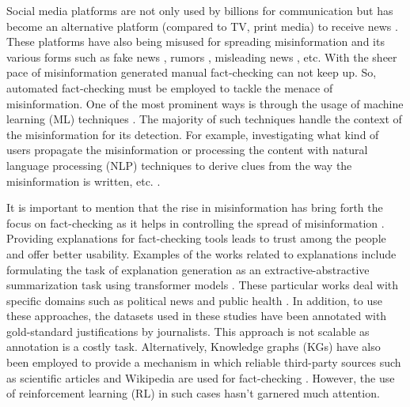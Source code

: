 Social media platforms are not only used by billions for communication but has become an alternative platform (compared to TV, print media) to receive news \cite{Boczkowski2017IncidentalNH}. These platforms have also being misused for spreading misinformation \cite{Flintham2018,jagtap2021misinformation} and its various forms such as fake news \cite{mayank2022deap,dhawan2022game}, rumors \cite{butt2022goes,sharma2021identifying}, misleading news \cite{sharma2022mis}, etc. %
With the sheer pace of misinformation generated manual fact-checking can not keep up. So, automated fact-checking %
must be employed to tackle the menace of misinformation. One of the most prominent ways is through the usage of machine learning (ML) techniques \cite{islam2020deep,shakshi2023mis}. %
The majority of such techniques handle the context of the misinformation for its detection. For example, investigating what kind of users propagate the misinformation \cite{ghenai2018fake} or processing the content with natural language processing (NLP) techniques to derive clues from the way the misinformation is written, etc. \cite{su2020motivations}. %



It is important to mention that the rise in misinformation has bring forth the focus on fact-checking as it helps in controlling the spread of misinformation \cite{martin2022facter,tymoshenko2021strong,sharma2022facov}. %
 Providing explanations for fact-checking tools leads to trust among the people and offer better usability. Examples of the works related to explanations include formulating the task of explanation generation as an extractive-abstractive summarization task using transformer models \cite{Atanasova2020, Kotonya2020}. These particular works deal with specific domains such as political news \cite{Atanasova2020} and public health \cite{Kotonya2020}. In addition, to use these approaches, the datasets used in these studies have been annotated with gold-standard justifications by journalists. This approach is not scalable as annotation is a costly task. Alternatively, Knowledge graphs (KGs) have also been employed to provide a mechanism in which reliable third-party sources such as scientific articles and Wikipedia are used for fact-checking \cite{Ahmadi2019, GadElrab2019, Schatz2021}.  However, the use of reinforcement learning (RL) in such cases hasn't garnered much attention.%


